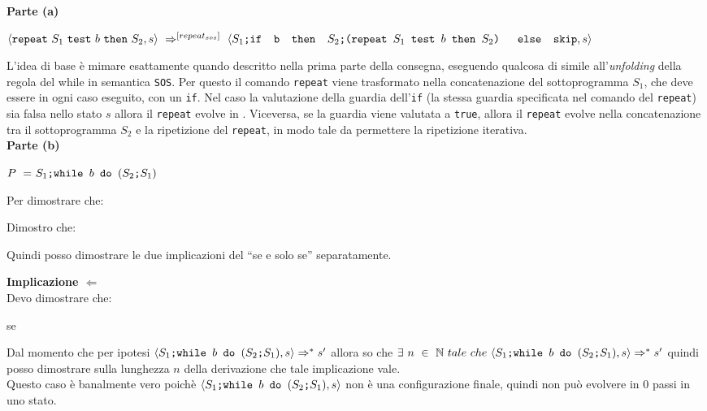 {
	\hspace*{\textwidth-}

	\textbf{Parte (a)}
	\begin{center}
	$\confSs{\repeatSbS{S_1}{b}{S_2}}{s}~\Rar{[repeat_{sos}]}~
	\confSs{\concat
	{$S_1$}
	{\ifABC{b}{\concat
	{$S_2$}
	{(\repeatSbS{$S_1$}{$b$}{$S_2$})}
	}{\skipistr}}
	}{s}$
	\end{center}
	L'idea di base è mimare esattamente quando descritto nella prima parte
	della consegna, eseguendo qualcosa di simile all'\emph{unfolding} della
	regola del while in semantica \texttt{SOS}. Per questo il comando
	\texttt{repeat} viene trasformato nella concatenazione del sottoprogramma
	$S_1$, che deve essere in ogni caso eseguito, con un \texttt{if}. Nel caso
	la valutazione della guardia dell'\texttt{if} (la stessa guardia
	specificata nel comando del \texttt{repeat}) sia falsa nello stato $s$
	allora il \texttt{repeat} evolve in \skipistr{}. Viceversa, se la guardia
	viene valutata a \texttt{true}, allora il \texttt{repeat} evolve nella
	concatenazione tra il sottoprogramma $S_2$ e la ripetizione del 
	\texttt{repeat}, in modo tale da permettere la ripetizione iterativa.\\

	\textbf{Parte (b)}
	\begin{center}
	$P~=~\PDef{}$
	\end{center}
	Per dimostrare che:
	\begin{center}
	\exThreeB{}
	\end{center}
	Dimostro che:
	\begin{center}
	\exThreeIff{}
	\end{center}
	Quindi posso dimostrare le due implicazioni del ``se e solo se''
	separatamente.


	\textbf{Implicazione $\Longleftarrow$}\\
	Devo dimostrare che:
	\begin{center}
	se \exThreeRtL{}
	\end{center}
	Dal momento che per ipotesi $\confSs{\PDef{}}{s}\Rar{*}s'$ allora so che
	$\exists{}~n~\in~\mathbb{N}~tale~che~\confSs{\PDef{}}{s}\Rar{*}s'$ quindi
	posso dimostrare sulla lunghezza $n$ della derivazione che tale
	implicazione vale.\\

	 Questo caso è banalmente vero poichè $\confSs{\PDef{}}{s}$
	non è una configurazione finale, quindi non può evolvere in 0 passi in uno
	stato.

}
